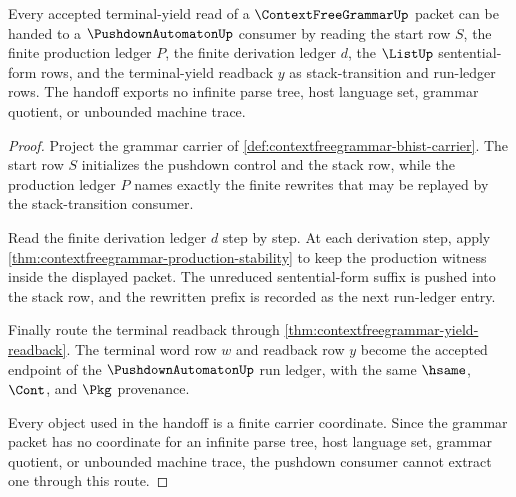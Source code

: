 \begin{theorem}
\label{thm:contextfreegrammar-pushdown-handoff}
Every accepted terminal-yield read of a $\ContextFreeGrammarUp$ packet can be
handed to a $\PushdownAutomatonUp$ consumer by reading the start row $S$, the
finite production ledger $P$, the finite derivation ledger $d$, the
$\ListUp$ sentential-form rows, and the terminal-yield readback $y$ as
stack-transition and run-ledger rows. The handoff exports no infinite parse
tree, host language set, grammar quotient, or unbounded machine trace.
\end{theorem}
\begin{proof}
Project the grammar carrier of
\autoref{def:contextfreegrammar-bhist-carrier}. The start row $S$ initializes
the pushdown control and the stack row, while the production ledger $P$ names
exactly the finite rewrites that may be replayed by the stack-transition
consumer.

Read the finite derivation ledger $d$ step by step. At each derivation step,
apply \autoref{thm:contextfreegrammar-production-stability} to keep the
production witness inside the displayed packet. The unreduced sentential-form
suffix is pushed into the stack row, and the rewritten prefix is recorded as
the next run-ledger entry.

Finally route the terminal readback through
\autoref{thm:contextfreegrammar-yield-readback}. The terminal word row $w$ and
readback row $y$ become the accepted endpoint of the $\PushdownAutomatonUp$
run ledger, with the same $\hsame$, $\Cont$, and $\Pkg$ provenance.

Every object used in the handoff is a finite carrier coordinate. Since the
grammar packet has no coordinate for an infinite parse tree, host language
set, grammar quotient, or unbounded machine trace, the pushdown consumer
cannot extract one through this route.
\end{proof}

